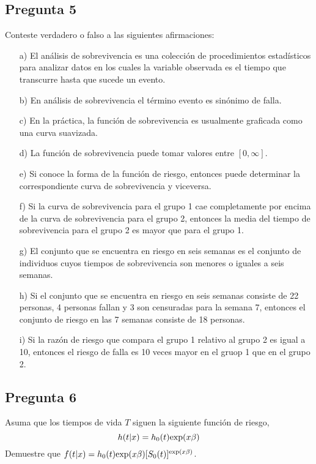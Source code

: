 \documentclass[10pt]{article}\usepackage[]{graphicx}\usepackage[]{color}
\begin{document}
\subsection*{Pregunta 5} 
Conteste verdadero o falso a las siguientes afirmaciones:
\begin{itemize}
\item[a)] El análisis de sobrevivencia es una colección de procedimientos estadísticos para analizar datos en los cuales la variable observada es el tiempo que transcurre hasta que sucede un evento.
\item[b)] En análisis de sobrevivencia el término evento es sinónimo de falla.
\item[c)] En la práctica, la función de sobrevivencia es usualmente graficada como una curva suavizada.
\item[d)] La función de sobrevivencia puede tomar valores entre $[0,\infty]$.
\item[e)] Si conoce la forma de la función de riesgo, entonces puede determinar la correspondiente curva de sobrevivencia y viceversa.
\item[f)] Si la curva de sobrevivencia para el grupo 1 cae completamente por encima de la curva de sobrevivencia para el grupo 2, entonces la media del tiempo de sobrevivencia para el grupo 2 es mayor que para el grupo 1.
\item[g)] El conjunto que se encuentra en riesgo en seis semanas es el conjunto de individuos cuyos tiempos de sobrevivencia son menores o iguales a seis semanas.
\item[h)] Si el conjunto que se encuentra en riesgo en seis semanas consiste de 22 personas, 4 personas fallan y 3 son censuradas para la semana 7, entonces el conjunto de riesgo en las 7 semanas consiste de 18 personas.
\item[i)] Si la razón de riesgo que compara el grupo 1 relativo al grupo 2 es igual a 10, entonces el riesgo de falla es 10 veces mayor en el gruop 1 que en el grupo 2.
\end{itemize}

\subsection*{Pregunta 6} 
Asuma que los tiempos de vida $T$ siguen la siguiente función de riesgo, 
$$h(t|x) =h_{0}(t)\textnormal{exp}(x\beta)$$
Demuestre que $f(t|x)=h_{0}(t)\textnormal{exp}(x\beta)[S_{0}(t)]^{\textnormal{exp}(x\beta)}$.\\
\end{document}
